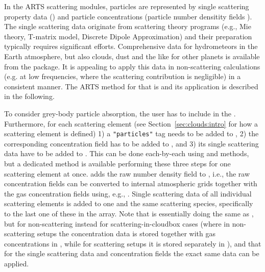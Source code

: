 In the ARTS scattering modules, particles are represented by single scattering
property data () and particle concentrations
(particle number densitity fields ).
The single scattering data originate from scattering theory
programs (e.g., Mie theory, T-matrix model, Discrete Dipole Approximation) and
their preparation typically requires significant efforts. Comprehensive data for
hydrometeors in the Earth atmosphere, but also clouds, dust and the like for
other planets is available from the  package.
It is appealing to apply this data in non-scattering calculations (e.g. at low
frequencies, where the scattering contribution is negligible) in a consistent
manner. The ARTS method for that is  and
its application is described in the following.

To consider grey-body particle absorption, the user has to include
 in the
. Furthermore, for each scattering element
(see Section~\ref{sec:clouds:intro} for how a scattering element is defined) 1) a
\verb|"particles"| tag needs to be added to , 2) the
corresponding concentration field has to be added to ,
and 3) its single scattering data have to be added to
. This can be done each-by-each using
 and  methods, but a dedicated method
 is available performing these three
steps for one scattering element at once. 
adds the raw number density field to , i.e., the raw
concentration fields can be converted to internal atmospheric grids together
with the gas concentration fields using, e.g., .
Single scattering data of all individual scattering elements is added to one and
the same scattering species, specifically to the last one of these in the
 array.
Note that  is essentially doing the same
as , but for non-scattering instead for
scattering-in-cloudbox cases (where in non-scattering setups the concentration
data is stored together with gas concentrations in ,
while for scattering setups it is stored separately in
), and that for the single scattering data and
concentration fields the exact same data can be applied.

